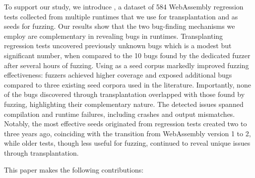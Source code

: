 \documentclass[lettersize,journal]{IEEEtran}
\begin{document}
To support our study, we introduce \rtbench{}, a dataset of 584 WebAssembly regression tests collected from multiple runtimes that we use for transplantation and as seeds for fuzzing. Our results show that the two bug-finding mechanisms we employ 
are complementary in revealing bugs in \wasm{} runtimes. Transplanting regression tests uncovered \textbf{\TransplantationBugsCount{}} previously unknown bugs which is a modest but significant number, when compared to the 10 bugs found by the dedicated fuzzer \wapplique{} after several hours of fuzzing. Using \rtbench{} as a seed corpus markedly improved fuzzing effectiveness: fuzzers achieved higher coverage and exposed \textbf{\FuzzingBugsCount{}} additional bugs compared to three existing seed corpora used in the literature. Importantly, none of the bugs discovered through transplantation overlapped with those found by fuzzing, highlighting their complementary nature. The detected issues spanned compilation and runtime failures, including crashes and output mismatches. Notably, the most effective seeds originated from regression tests created two to three years ago, coinciding with the transition from WebAssembly version 1 to 2, while older tests, though less useful for fuzzing, continued to reveal unique issues through transplantation.

This paper makes the following contributions:
\end{document}
